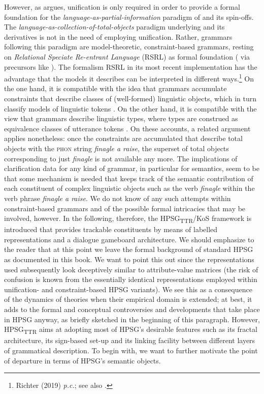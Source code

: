 \documentclass[output=paper]{langsci/langscibook}
\begin{document}
{However, as \citet[Chapter 2]{Richter:2000} argues, unification is only required in order to provide a formal foundation for the \textit{language-as-partial-information} paradigm of \citet{Pollard:Sag:1987} and its spin-offs. 
%
The \textit{language-as-collection-of-total-objects} paradigm underlying \citet{Pollard:Sag:1994} and its derivatives is not in the need of employing unification.
%
Rather, grammars following this paradigm are model-theoretic, constraint-based grammars, resting on \emph{Relational Speciate Re-entrant Language} (RSRL) as formal foundation (\citet{Richter:2000} via precursors like \citet{Penn:1999}).
%
The formalism RSRL in its most recent implementation \citep{Richter:2004} has the advantage that the models it describes can be interpreted in different ways.\footnote{Richter (2019) \textit{p.c.}; see also .}
%
On the one hand, it is compatible with the idea that grammars accumulate constraints that describe classes of (well-formed) linguistic objects, which in turn classify models of linguistic tokens
\citep{King:1999}.
%
On the other hand, it is compatible with the view that grammars describe linguistic types, where types are construed as equivalence classes of utterance tokens \citep{Pollard:1999}.
%
On these accounts, a related argument applies nonetheless: once the constraints are accumulated that describe total objects with the \textsc{phon} string \textit{finagle a raise}, the superset of total objects corresponding to just \textit{finagle} is not available any more.
%
The implications of clarification data for any kind of grammar, in particular for semantics, seem to be that some mechanism is needed that keeps track of the semantic contribution of each constituent of complex linguistic objects such as the verb \textit{finagle} within the verb phrase \textit{finagle a raise}.
%
We do not know of any such attempts within constraint-based grammars and of the possible formal intricacies that may be involved, however.
%
In the following, therefore, the HPSG\textsubscript{TTR}/KoS framework is introduced that provides trackable constituents by means of labelled representations and a dialogue gameboard architecture.
  
%
We should emphasize to the reader that at this point we leave the formal background of standard HPSG as documented in this book.
%
We want to point this out since the representations used subsequently look deceptively similar to attribute-value matrices (the risk of confusion is known from the essentially identical representations employed within unification- and constraint-based HPSG variants).
%
We see this as a consequence of the dynamics of theories when their empirical domain is extended; at best, it adds to the formal and conceptual controversies and developments that take place in HPSG anyway, as briefly sketched in the beginning of this paragraph. 
%
However, HPSG\textsubscript{TTR} aims at adopting most of HPSG's desirable features such as its fractal architecture, its sign-based set-up and its linking facility between different layers of grammatical description. 
%
To begin with, we want to further motivate the point of departure in terms of HPSG's semantic objects.


}
\end{document}
